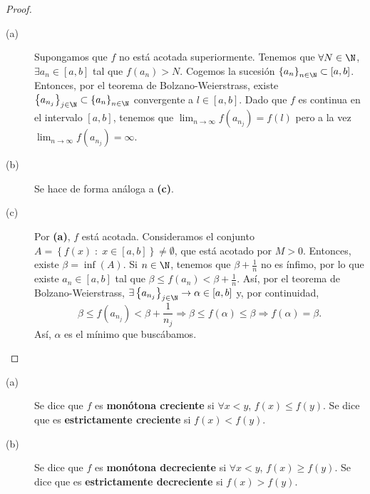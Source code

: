 \begin{proof}
\begin{description}
	\item[(a)] Supongamos que $\displaystyle f $ no está acotada superiormente. Tenemos que $\displaystyle \forall N \in \N $, $\displaystyle \exists a_{n} \in [a,b] $ tal que $\displaystyle f\left(a_{n}\right) > N $. Cogemos la sucesión $\displaystyle \left\{ a_{n}\right\} _{n\in\N}\subset[a,b] $. Entonces, por el teorema de Bolzano-Weierstrass, existe $\displaystyle \left\{ a_{n_{j}}\right\} _{j\in\N} \subset \left\{ a_{n}\right\} _{n\in\N} $ convergente a $\displaystyle l \in [a,b] $. 
		Dado que $\displaystyle f $ es continua en el intervalo $\displaystyle \left[a,b\right]  $, tenemos que $\displaystyle \lim_{n \to \infty}f\left(a_{n_{j}}\right) = f\left(l\right) $ pero a la vez $\displaystyle \lim_{n \to \infty}f\left(a_{n_{j}}\right) =\infty $.
	\item[(b)] Se hace de forma análoga a \textbf{(c)}.
	\item[(c)] Por \textbf{(a)}, $\displaystyle f $ está acotada. Consideramos el conjunto $\displaystyle A = \left\{ f\left(x\right) \; : \; x \in [a,b]\right\} \neq \emptyset $, que está acotado por $\displaystyle M > 0 $. Entonces, existe $\displaystyle \beta = \inf\left(A\right) $. Si $\displaystyle n \in \N $, tenemos que $\displaystyle \beta + \frac{1}{n} $ no es ínfimo, por lo que existe $\displaystyle a_{n} \in [a,b] $ tal que $\displaystyle \beta \leq f\left(a_{n}\right) < \beta + \frac{1}{n} $.
		Así, por el teorema de Bolzano-Weierstrass, $\displaystyle \exists \left\{ a_{n_{j}}\right\} _{j\in\N} \to \alpha \in \left[a,b\right]  $ y, por continuidad,
		\[\beta \leq f\left(a_{n_{j}}\right) < \beta + \frac{1}{n_{j}} \Rightarrow \beta \leq f\left(\alpha\right) \leq \beta \Rightarrow f\left(\alpha \right) = \beta  .\]
	Así, $\displaystyle \alpha $ es el mínimo que buscábamos.
\end{description}
\end{proof}
\begin{fdefinition}[Monotonía]
\normalfont 
\begin{description}
\item[(a)] Se dice que $\displaystyle f $ es \textbf{monótona creciente} si $\displaystyle \forall x < y $, $\displaystyle f\left(x\right) \leq f\left(y\right) $. Se dice que es \textbf{estrictamente creciente} si $\displaystyle f\left(x\right) < f\left(y\right) $.
\item[(b)] Se dice que $\displaystyle f $ es \textbf{monótona decreciente} si $\displaystyle \forall x < y $, $\displaystyle f\left(x\right) \geq f\left(y\right) $. Se dice que es \textbf{estrictamente decreciente} si $\displaystyle f\left(x\right) > f\left(y\right) $.
\end{description}
\end{fdefinition}
